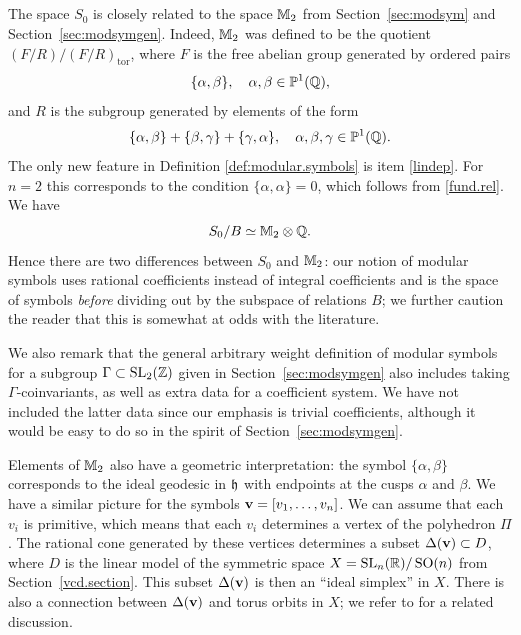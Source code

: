 \subsection{}\label{sec:comparison}
%
The space $S_{0}$ is closely related to the space $\mathbb{M}_{2}$ from
Section~\ref{sec:modsym} and Section~\ref{sec:modsymgen}.  Indeed, $\mathbb{M}_{2}$ was
defined to be the quotient $(F/R)/ (F/R)_{\text{tor}}$, where $F$ is
the free abelian group generated by ordered pairs
\begin{equation}\label{symbol.def}
\{\alpha ,\beta \}, \quad \alpha ,\beta \in {\mathbb P}^{1} (\mathbb{Q}),
\end{equation}
and $R$ is the subgroup generated by elements of the form
\begin{equation}\label{fund.rel}
  \{\alpha,\beta\} + \{\beta,\gamma\} + \{\gamma,\alpha\}, \quad
\alpha ,\beta, \gamma  \in {\mathbb P}^{1} (\mathbb{Q}).
\end{equation}
The only new feature in Definition \ref{def:modular.symbols} is item
\eqref{lindep}.  For $n=2$ this corresponds to the condition $\{\alpha,\alpha
\}=0$, which follows from \eqref{fund.rel}.  
We have
\[
S_{0}/B \simeq \mathbb{M}_{2} \otimes \mathbb{Q}.
\]
Hence there are two differences between $S_{0}$ and $\mathbb{M}_{2}$: our
notion of modular symbols uses rational coefficients instead of
integral coefficients and is the space of symbols \emph{before}
dividing out by the subspace of relations $B$; we further caution the
reader that this is somewhat at
odds with the literature. 

We also remark that the general arbitrary weight definition of modular
symbols for a subgroup $\Gamma \subset \operatorname{SL}_{2} (\mathbb{Z})$ given in
Section~\ref{sec:modsymgen} also includes taking $\Gamma$-coinvariants, as
well as extra data for a coefficient system.  We have not included the
latter data since our emphasis is trivial coefficients, although it
would be easy to do so in the spirit of Section~\ref{sec:modsymgen}.

Elements of $\mathbb{M}_{2}$ also have a geometric interpretation: the symbol
$\{\alpha ,\beta \}$ corresponds to the ideal geodesic in $\mathfrak h$ with
endpoints at the cusps $\alpha$ and $\beta$.  We have a similar
picture for the symbols ${\mathbf {v}} = [v_{1},\dotsc ,v_{n}]$.  We can assume
that each $v_{i}$ is primitive, which means that each $v_{i}$
determines a vertex of the \Vor polyhedron $\Pi$.  The rational cone
generated by these vertices determines a subset $\Delta ({\mathbf {v}})\subset
D$, where $D$ is the linear model of the symmetric space $X = \operatorname{SL}_{n}
(\mathbb{R})/\operatorname{SO} (n)$ from Section~\ref{vcd.section}.  This subset $\Delta ({\mathbf {v}})$ is
then an ``ideal simplex'' in $X$.  There is also a connection between
$\Delta ({\mathbf {v}})$ and torus orbits in $X$; we refer to \cite{ash.minmod}
for a related discussion.

